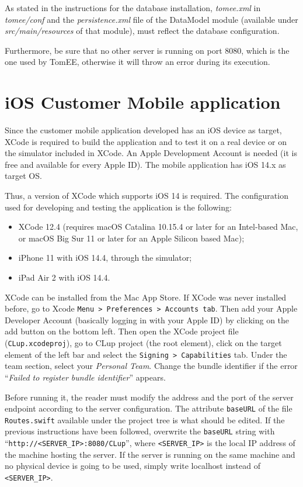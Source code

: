 \documentclass[a4paper,oneside,11pt]{book}
\begin{document}
    As stated in the instructions for the database installation, \textit{tomee.xml} in \textit{tomee/conf} and the \textit{persistence.xml} file of the DataModel module (available under \textit{src/main/resources} of that module), must reflect the database configuration. \par
    Furthermore, be sure that no other server is running on port 8080, which is the one used by TomEE, otherwise it will throw an error during its execution.

    \section{iOS Customer Mobile application}
    Since the customer mobile application developed has an iOS device as target, XCode is required to build the application and to test it on a real device or on the simulator included in XCode. An Apple Development Account is needed (it is free and available for every Apple ID). The mobile application has iOS 14.x as target OS. \par
    Thus, a version of XCode which supports iOS 14 is required. The configuration used for developing and testing the application is the following:
    \begin{itemize}
        \item XCode 12.4 (requires macOS Catalina 10.15.4 or later for an Intel-based Mac, or macOS Big Sur 11 or later for an Apple Silicon based Mac);
        \item iPhone 11 with iOS 14.4, through the simulator;
        \item iPad Air 2 with iOS 14.4.
    \end{itemize}
    XCode can be installed from the Mac App Store. If XCode was never installed before, go to Xcode \texttt{Menu > Preferences > Accounts tab}. Then add your Apple Developer Account (basically logging in with your Apple ID) by clicking on the add button on the bottom left. Then open the XCode project file (\texttt{CLup.xcodeproj}), go to CLup project (the root element), click on the target element of the left bar and select the \texttt{Signing > Capabilities} tab. Under the team section, select your \textit{Personal Team}. Change the bundle identifier if the error “\textit{Failed to register bundle identifier}” appears. \par
    Before running it, the reader must modify the address and the port of the server endpoint according to the server configuration. The attribute \texttt{baseURL} of the file \texttt{Routes.swift} available under the project tree is what should be edited. If the previous instructions have been followed, overwrite the \texttt{baseURL} string with “\texttt{http://<SERVER\_IP>:8080/CLup}”, where \texttt{<SERVER\_IP>} is the local IP address of the machine hosting the server. If the server is running on the same machine and no physical device is going to be used, simply write localhost instead of \texttt{<SERVER\_IP>}. \par
\end{document}
